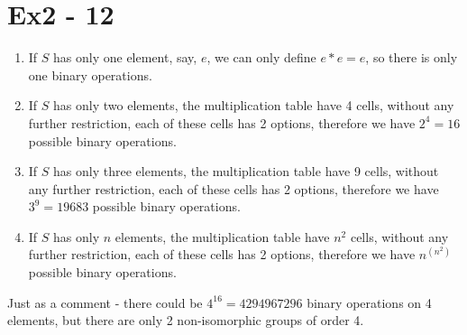 \section*{Ex2 - 12}
\begin{enumerate}
\item{If $ S $ has only one element, say, $ e $, we can only define $ e * e = e $, so there is only one binary operations.}
\item{If $ S $ has only two elements, the multiplication table have 4 cells, without any further restriction, each of these cells has 2 options, therefore we have $ 2^4 = 16 $ possible binary operations.}
\item{If $ S $ has only three elements, the multiplication table have 9 cells, without any further restriction, each of these cells has 2 options, therefore we have $ 3^9 = 19683 $ possible binary operations.}
\item{If $ S $ has only $ n $ elements, the multiplication table have $ n^2 $ cells, without any further restriction, each of these cells has 2 options, therefore we have $ n^(n^2) $ possible binary operations.}
\end{enumerate}

Just as a comment - there could be $ 4^16 = 4294967296 $ binary operations on 4 elements, but there are only 2 non-isomorphic groups of order 4.